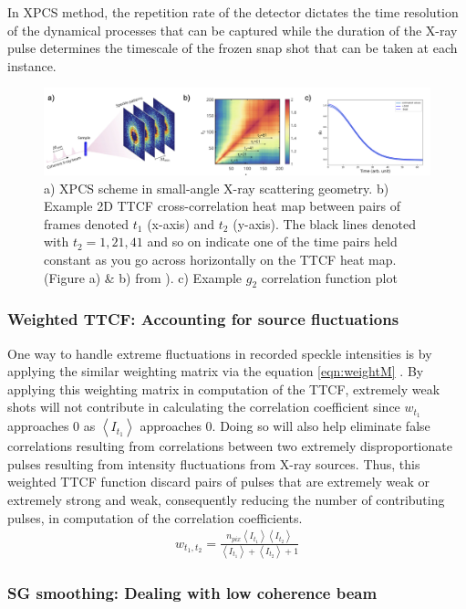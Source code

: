 \documentclass[11pt]{article}
\theoremstyle{definition}
\begin{document}
In XPCS method, the repetition rate of the detector dictates the time resolution of the dynamical processes that can be captured \cite{jo_single_2023} while the duration of the X-ray pulse determines the timescale of the frozen snap shot that can be taken at each instance.
\begin{figure}[ht!]
    \centering
    \includegraphics[width=165mm]{figures/xpcs_fig.001.jpeg}
    \caption{a) XPCS scheme in small-angle X-ray scattering geometry. b) Example 2D TTCF cross-correlation heat map between pairs of frames denoted $t_1$ (x-axis) and $t_2$ (y-axis). The black lines denoted with \(t_2 = 1, 21, 41\) and so on indicate one of the time pairs held constant as you go across horizontally on the TTCF heat map. (Figure a) \& b) from \cite{lehmkuhler_femtoseconds_2021}). c) Example \(g_2\) correlation function plot}
    \label{fig:xpcs_example}
\end{figure}
\subsubsection{Weighted TTCF: Accounting for source fluctuations}
One way to handle extreme fluctuations in recorded speckle intensities is by applying the similar weighting matrix via the equation \eqref{eqn:weightM} \cite{cao_effect_2020}. By applying this weighting matrix in computation of the TTCF, extremely weak shots will not contribute in calculating the correlation coefficient since $ w_{t_1}$ approaches 0 as $\left<I_{t_1}\right>$ approaches 0. Doing so will also help eliminate false correlations resulting from correlations between two extremely disproportionate pulses resulting from intensity fluctuations from X-ray sources. Thus, this weighted TTCF function discard pairs of pulses that are extremely weak or extremely strong and weak, consequently reducing the number of contributing pulses, in computation of the correlation coefficients.
\begin{align}\label{eqn:weightM}
w_{t_1, t_2} = \frac{n_{pix} \left<I_{t_1}\right> \left<I_{t_2}\right>}{\left<I_{t_1}\right> + \left<I_{t_2}\right> + 1}
\end{align}
\subsubsection{SG smoothing: Dealing with low coherence beam}
\end{document}
